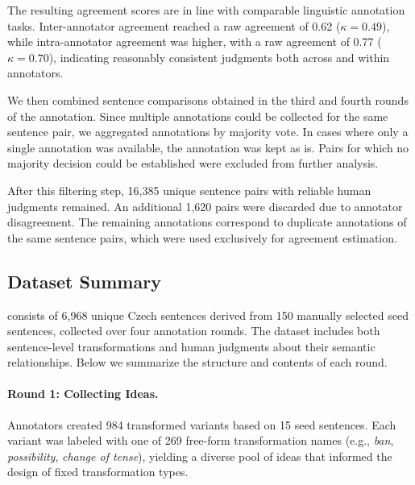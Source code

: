 The resulting agreement scores are in line with comparable linguistic annotation tasks. Inter-annotator agreement reached a raw agreement of 0.62 ($\kappa = 0.49$), while intra-annotator agreement was higher, with a raw agreement of 0.77 ($\kappa = 0.70$), indicating reasonably consistent judgments both across and within annotators.

We then combined sentence comparisons obtained in the third and fourth rounds of the annotation. Since multiple annotations could be collected for the same sentence pair, we aggregated annotations by majority vote. In cases where only a single annotation was available, the annotation was kept as is. Pairs for which no majority decision could be established were excluded from further analysis.

After this filtering step, 16{,}385 unique sentence pairs with reliable human judgments remained. An additional 1{,}620 pairs were discarded due to annotator disagreement. The remaining annotations correspond to duplicate annotations of the same sentence pairs, which were used exclusively for agreement estimation.

\subsection{Dataset Summary}

\costra consists of 6{,}968 unique Czech sentences derived from 150 manually selected seed sentences, collected over four annotation rounds. The dataset includes both sentence-level transformations and human judgments about their semantic relationships. Below we summarize the structure and contents of each round.

\paragraph{Round 1: Collecting Ideas.}  
Annotators created 984 transformed variants based on 15 seed sentences. Each variant was labeled with one of 269 free-form transformation names (e.g., \emph{ban}, \emph{possibility}, \emph{change of tense}), yielding a diverse pool of ideas that informed the design of fixed transformation types.

